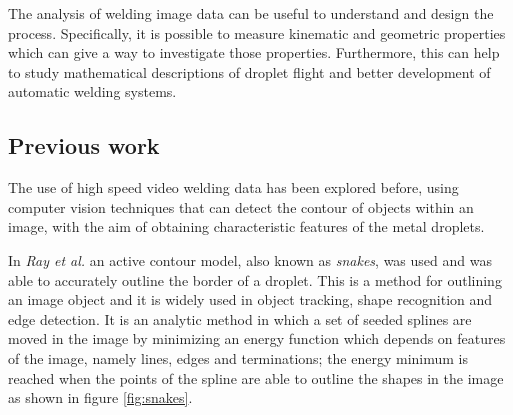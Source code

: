 The analysis of welding image data can be useful to understand and design the process. Specifically, it is possible to measure kinematic and geometric properties which  can give a way to investigate those properties. Furthermore, this can help to study mathematical descriptions of droplet flight and better development of automatic welding systems.
\subsection{Previous work}


The use of high speed video welding data has been explored before, using computer vision techniques that can detect the contour of objects within an image, with the aim of obtaining characteristic features of the metal droplets. 

In \textit{Ray et al.} \cite{Ray} an active contour model, also known as \textit{snakes}, was used and was able to accurately outline the border of a droplet. This is a method for outlining an image object and it is widely used in object tracking, shape recognition and edge detection. It is an analytic method in which a set of seeded splines are moved in the image by minimizing an energy function which depends on features of the image, namely lines, edges and terminations; the energy minimum is reached when the points of the spline are able to outline the shapes in the image \cite{Kass} as shown in figure \ref{fig:snakes}.

